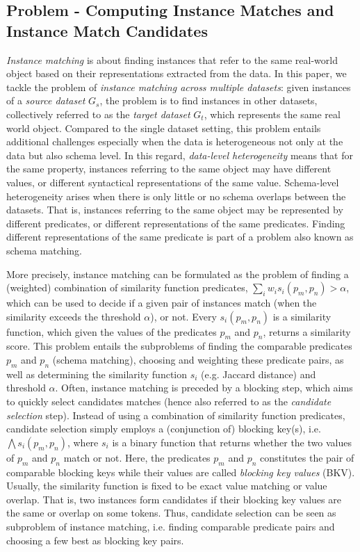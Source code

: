 \subsection{Problem - Computing Instance Matches and Instance Match Candidates} \emph{Instance matching} is about finding instances that refer to the same real-world object based on their representations extracted from the data. In this paper, we tackle the problem of \emph{instance matching across multiple datasets}: given instances of a \emph{source dataset} $G_s$, the problem is to find instances in other datasets, collectively referred to as the \emph{target dataset} $G_t$, which represents the same real world object. Compared to the single dataset setting, this problem entails additional challenges especially when the data is heterogeneous not only at the data but also schema level. In this regard, \emph{data-level heterogeneity} means that for the same property, instances referring to the same object may have different values, or different syntactical representations of the same value.  Schema-level heterogeneity arises when there is only little or no schema overlaps between the datasets. That is, instances referring to the same object may be represented by different predicates, or different representations of the same predicates. Finding different representations of the same predicate is part of a problem also known as schema matching. 

More precisely, instance matching can be formulated as the problem of finding a (weighted) combination of similarity function predicates, $\sum_i{w_i s_i(p_m,p_n)} > \alpha$, which can be used to decide if a given pair of instances match (when the similarity exceeds the threshold $\alpha$), or not. Every $s_i(p_m,p_n)$ is a similarity function, which given the values of the predicates $p_m$ and $p_n$, returns a similarity score. This problem entails the subproblems of finding the comparable predicates $p_m$ and $p_n$ (schema matching), choosing and weighting these predicate pairs, as well as determining the similarity function $s_i$ (e.g. Jaccard distance) and threshold $\alpha$.  Often, instance matching is preceded by a blocking step, which aims to quickly select candidates matches (hence also referred to as the \emph{candidate selection} step). Instead of using a combination of similarity function predicates, candidate selection simply employs a (conjunction of) blocking key(s), i.e. $\bigwedge s_i(p_m,p_n)$, where $s_i$ is a binary function that returns whether the two values of $p_m$ and $p_n$ match or not. Here, the predicates $p_m$ and $p_n$ constitutes the pair of comparable blocking keys while their values are called \emph{blocking key values} (BKV). Usually, the similarity function is fixed to be exact value matching or value overlap. That is, two instances form candidates if their blocking key values are the same or overlap on some tokens. Thus, candidate selection can be seen as subproblem of instance matching, i.e. finding comparable predicate pairs and choosing a few best as blocking key pairs. 


